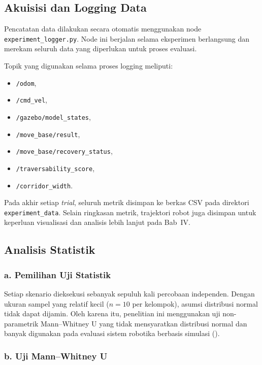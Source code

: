 \subsection{Akuisisi dan Logging Data}

Pencatatan data dilakukan secara otomatis menggunakan node \texttt{experiment\_logger.py}. Node ini berjalan selama eksperimen berlangsung dan merekam seluruh data yang diperlukan untuk proses evaluasi.

Topik yang digunakan selama proses logging meliputi:

\begin{itemize}
\item \texttt{/odom},
\item \texttt{/cmd\_vel},
\item \texttt{/gazebo/model\_states},
\item \texttt{/move\_base/result},
\item \texttt{/move\_base/recovery\_status},
\item \texttt{/traversability\_score},
\item \texttt{/corridor\_width}.
\end{itemize}

Pada akhir setiap \textit{trial}, seluruh metrik disimpan ke berkas CSV pada direktori \texttt{experime\-nt\_data}. Selain ringkasan metrik, trajektori robot juga disimpan untuk keperluan visualisasi dan analisis lebih lanjut pada Bab~IV.

\subsection{Analisis Statistik}

\subsubsection*{a. Pemilihan Uji Statistik}

Setiap skenario dieksekusi sebanyak sepuluh kali percobaan independen. Dengan ukuran sampel yang relatif kecil ($n = 10$ per kelompok), asumsi distribusi normal tidak dapat dijamin. Oleh karena itu, penelitian ini menggunakan uji non-parametrik Mann--Whitney U yang tidak mensyaratkan distribusi normal dan banyak digunakan pada evaluasi sistem robotika berbasis simulasi (\cite{Adiuku2024}).

\subsubsection*{b. Uji Mann--Whitney U}

